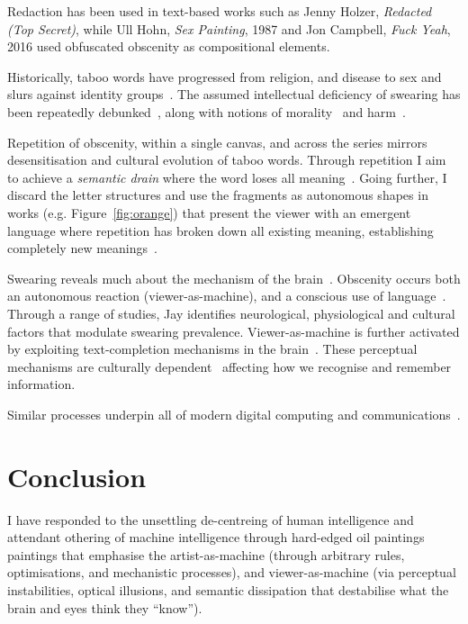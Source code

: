\documentclass[12pt]{article}
\begin{document}
Redaction has been used in text-based works such as Jenny Holzer,
\emph{Redacted (Top Secret)}, while Ull Hohn, \emph{Sex Painting},
1987 and Jon Campbell, \emph{Fuck Yeah}, 2016 used obfuscated obscenity
as compositional elements.

Historically, taboo words have progressed from religion, and disease
to sex and slurs against identity
groups~\cite{douglas1966purity,pinker2008seven,mcwhorter2024nine}. The
assumed intellectual deficiency of swearing has been repeatedly
debunked~\cite{reiman2022swearfluency,jay2015taboo}, along with
notions of morality~\cite{pinker2017moral,devries2023swearing} and
harm~\cite{jay2009offensive}.

Repetition of obscenity, within a single canvas, and across the series
mirrors desensitisation and cultural evolution of taboo words.
Through repetition I aim to achieve a \emph{semantic drain} where the
word loses all
meaning~\cite{barthes1957mythologies,derrida1972dissemination}. Going
further, I discard the letter structures and use the fragments as
autonomous shapes in works (e.g. Figure~\ref{fig:orange}) that present
the viewer with an emergent language where repetition has broken down
all existing meaning, establishing completely new
meanings~\cite{derrida1972dissemination,deleuze1968difference,baudrillard1981simulacra}.

Swearing reveals much about the mechanism of the
brain~\cite{bergen2018what}. Obscenity occurs both an autonomous
reaction (viewer-as-machine), and a conscious use of
language~\cite{jay1999why}.  Through a range of studies, Jay
identifies neurological, physiological and cultural factors that
modulate swearing prevalence. Viewer-as-machine is further activated
by exploiting text-completion mechanisms in the
brain~\cite{Taylor1953,Reicher1969,Healy1976,GraingerWhitney2004,CohenDehaene2000,Levy2008}. These
perceptual mechanisms are culturally
dependent~\cite{Bartlett1932,Hall1976,ChuaBolandNisbett2005,MasudaNisbett2001}
affecting how we recognise and remember information.

Similar processes underpin all of modern digital computing and
communications~\cite{shannon1948}.

\section{Conclusion}
I have responded to the unsettling de-centreing of human intelligence
and attendant othering of machine intelligence through hard-edged oil
paintings paintings that emphasise the artist-as-machine (through
arbitrary rules, optimisations, and mechanistic processes), and
viewer-as-machine (via perceptual instabilities, optical illusions,
and semantic dissipation that destabilise what the brain and eyes
think they ``know''). 
\end{document}
